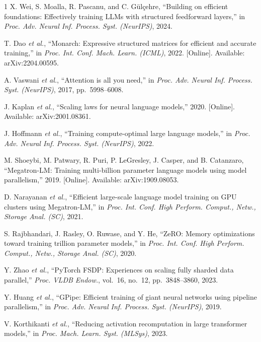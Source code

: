 \documentclass[10pt,journal]{IEEEtran}
\begin{document}
\begin{thebibliography}{1}
X. Wei, S. Moalla, R. Pascanu, and C. Gülçehre, ``Building on efficient foundations:
Effectively training LLMs with structured feedforward layers,'' in \emph{Proc. Adv. Neural
Inf. Process. Syst. (NeurIPS)}, 2024.

T. Dao \emph{et al.}, ``Monarch: Expressive structured matrices for efficient and accurate
training,'' in \emph{Proc. Int. Conf. Mach. Learn. (ICML)}, 2022. [Online]. Available:
arXiv:2204.00595.

A. Vaswani \emph{et al.}, ``Attention is all you need,'' in \emph{Proc. Adv. Neural Inf.
Process. Syst. (NeurIPS)}, 2017, pp.~5998--6008.

J. Kaplan \emph{et al.}, ``Scaling laws for neural language models,'' 2020. [Online].
Available: arXiv:2001.08361.

J. Hoffmann \emph{et al.}, ``Training compute-optimal large language models,'' in
\emph{Proc. Adv. Neural Inf. Process. Syst. (NeurIPS)}, 2022.

M. Shoeybi, M. Patwary, R. Puri, P. LeGresley, J. Casper, and B. Catanzaro, ``Megatron-LM:
Training multi-billion parameter language models using model parallelism,'' 2019. [Online].
Available: arXiv:1909.08053.

D. Narayanan \emph{et al.}, ``Efficient large-scale language model training on GPU clusters
using Megatron-LM,'' in \emph{Proc. Int. Conf. High Perform. Comput., Netw., Storage Anal.
(SC)}, 2021.

S. Rajbhandari, J. Rasley, O. Ruwase, and Y. He, ``ZeRO: Memory optimizations toward training
trillion parameter models,'' in \emph{Proc. Int. Conf. High Perform. Comput., Netw., Storage
Anal. (SC)}, 2020.

Y. Zhao \emph{et al.}, ``PyTorch FSDP: Experiences on scaling fully sharded data parallel,''
\emph{Proc. VLDB Endow.}, vol.~16, no.~12, pp.~3848--3860, 2023.

Y. Huang \emph{et al.}, ``GPipe: Efficient training of giant neural networks using pipeline
parallelism,'' in \emph{Proc. Adv. Neural Inf. Process. Syst. (NeurIPS)}, 2019.

V. Korthikanti \emph{et al.}, ``Reducing activation recomputation in large transformer
models,'' in \emph{Proc. Mach. Learn. Syst. (MLSys)}, 2023.


\end{thebibliography}
\end{document}
